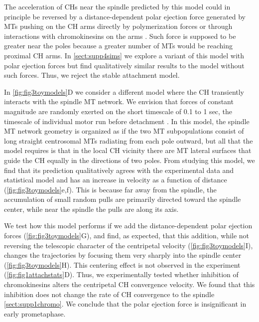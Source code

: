 \documentclass[times, twoside,onecolumn]{zHenriquesLab-StyleBioRxiv}
\begin{document}
The acceleration of CHs near the spindle predicted by this model could in principle be reversed by a distance-dependent polar ejection force generated by MTs pushing on the CH arms directly by polymerization forces or through interactions with chromokinesins on the arms \cite{riederMotileKinetochoresPolar1994,tokai-nishizumiChromokinesinKidRequired2005}. Such force is supposed to be greater near the poles because a greater number of MTs would be reaching proximal CH arms. In \cref{sect:supp4sims} we explore a variant of this model with polar ejection forces but find qualitatively similar results to the model without such forces. Thus, we reject the stable attachment model. 

In \cref{fig:fig3toymodels}D we consider a different model where the CH transiently interacts with the spindle MT network. We envision that forces of constant magnitude are randomly exerted on the short timescale of 0.1 to 1 sec, the timescale of individual motor run before detachment \cite{kunwar2011mechanical}. In this model, the spindle MT network geometry is organized as if the two MT subpopulations consist of long straight centrosomal MTs radiating from each pole outward, but all that the model requires is that in the local CH vicinity there are MT lateral surfaces that guide the CH equally in the directions of two poles.  From studying this model, we find that its prediction qualitatively agrees with the experimental data and statistical model and has an increase in velocity as a function of distance (\cref{fig:fig3toymodels}e,f). This is because far away from the spindle, the accumulation of small random pulls are primarily directed toward the spindle center, while near the spindle the pulls are along its axis.   

We test how this model performs if we add the distance-dependent polar ejection forces (\cref{fig:fig3toymodels}G), and find, as expected, that this addition, while not reversing the telescopic character of the centripetal velocity (\cref{fig:fig3toymodels}I), changes the trajectories by focusing them very sharply into the spindle center (\cref{fig:fig3toymodels}H). This centering effect is not observed in the experiment (\cref{fig:fig1attachstats}D). Thus, we experimentally tested whether inhibition of chromokinesins alters the centripetal CH convergence velocity. We found that this inhibition does not change the rate of CH convergence to the spindle \cref{sect:supp1chromo}. We conclude that the polar ejection force is insignificant in early prometaphase.
\end{document}
